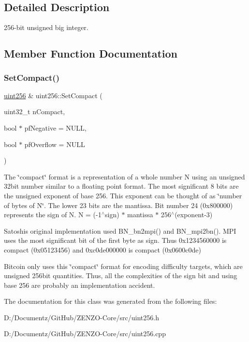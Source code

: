 \subsection{Detailed Description}
256-\/bit unsigned big integer. 

\subsection{Member Function Documentation}
\mbox{\label{classuint256_a54bc91c8535c43f881bba1fdb11ca7fa}} 
\subsubsection{\texorpdfstring{SetCompact()}{SetCompact()}}
{\footnotesize\ttfamily \mbox{\hyperlink{classuint256}{uint256}} \& uint256\+::\+Set\+Compact (\begin{DoxyParamCaption}\item[{uint32\+\_\+t}]{n\+Compact,  }\item[{bool $\ast$}]{pf\+Negative = {\ttfamily NULL},  }\item[{bool $\ast$}]{pf\+Overflow = {\ttfamily NULL} }\end{DoxyParamCaption})}

The \char`\"{}compact\char`\"{} format is a representation of a whole number N using an unsigned 32bit number similar to a floating point format. The most significant 8 bits are the unsigned exponent of base 256. This exponent can be thought of as \char`\"{}number of bytes of N\char`\"{}. The lower 23 bits are the mantissa. Bit number 24 (0x800000) represents the sign of N. N = (-\/1$^\wedge$sign) $\ast$ mantissa $\ast$ 256$^\wedge$(exponent-\/3)

Satoshi\textquotesingle{}s original implementation used B\+N\+\_\+bn2mpi() and B\+N\+\_\+mpi2bn(). M\+PI uses the most significant bit of the first byte as sign. Thus 0x1234560000 is compact (0x05123456) and 0xc0de000000 is compact (0x0600c0de)

Bitcoin only uses this \char`\"{}compact\char`\"{} format for encoding difficulty targets, which are unsigned 256bit quantities. Thus, all the complexities of the sign bit and using base 256 are probably an implementation accident. 

The documentation for this class was generated from the following files\+:\begin{DoxyCompactItemize}
\item 
D\+:/\+Documentz/\+Git\+Hub/\+Z\+E\+N\+Z\+O-\/\+Core/src/uint256.\+h\item 
D\+:/\+Documentz/\+Git\+Hub/\+Z\+E\+N\+Z\+O-\/\+Core/src/uint256.\+cpp\end{DoxyCompactItemize}
